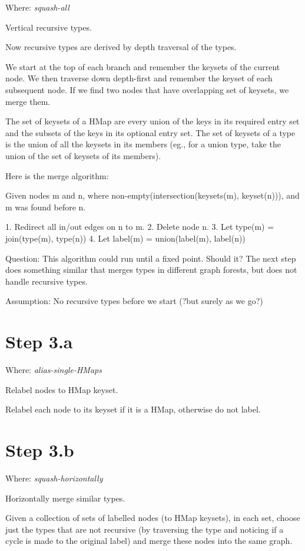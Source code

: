Where: \emph{squash-all}

Vertical recursive types.

Now recursive types are derived by
depth traversal of the types.

We start at the top of each branch and remember
the keysets of the current node.
We then traverse down depth-first and remember
the keyset of each subsequent node. 
If we find two nodes that have overlapping set of keysets,
we merge them.

The set of keysets of a HMap are every union of the keys
in its required entry set and the subsets of the
keys in its optional entry set.
The set of keysets of a type is the union of
all the keysets in its members (eg., for a union type,
take the union of the set of keysets of its members).

Here is the merge algorithm:

Given nodes m and n, where non-empty(intersection(keysets(m), keyset(n))),
and m was found before n.

1. Redirect all in/out edges on n to m.
2. Delete node n.
3. Let type(m) = join(type(m), type(n))
4. Let label(m) = union(label(m), label(n))

Question: This algorithm could run until a fixed point.
Should it? The next step does something similar that
merges types in different graph forests, but does
not handle recursive types.

Assumption: No recursive types before we start 
(?but surely as we go?)

\section{Step 3.a}

Where: \emph{alias-single-HMaps}

Relabel nodes to HMap keyset.

Relabel each node to its keyset if it is
a HMap, otherwise do not label.

\section{Step 3.b}

Where: \emph{squash-horizontally}

Horizontally merge similar types.

Given a collection of sets of labelled nodes (to HMap
keysets), in each set, choose just the types
that are not recursive (by traversing the type and
noticing if a cycle is made to the original label)
and merge these nodes into the same graph.

